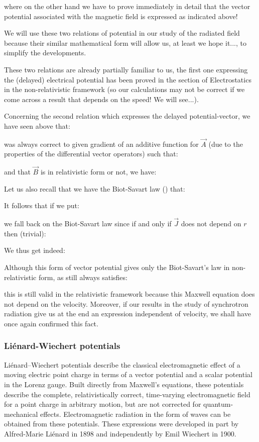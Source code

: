 	where on the other hand we have to prove immediately in detail that the vector potential associated with the magnetic field is expressed as indicated above!
	\begin{tcolorbox}[title=Remark,colframe=black,arc=10pt]
	We will use these two relations of potential in our study of the radiated field because their similar mathematical form will allow us, at least we hope it..., to simplify the developments.
	\end{tcolorbox}
	These two relations are already partially familiar to us, the first one expressing the (delayed) electrical potential has been proved in the section of Electrostatics in the non-relativistic framework (so our calculations may not be correct if we come across a result that depends on the speed! We will see...).

	Concerning the second relation which expresses the delayed potential-vector, we have seen above that:
	
	was always correct to given gradient of an additive function for $\vec{A}$ (due to the properties of the differential vector operators) such that:
	
	and that $\vec{B}$ is in relativistic form or not, we have:
	
	Let us also recall that we have the Biot-Savart law () that:
	
	It follows that if we put:
	
	we fall back on the Biot-Savart law since if and only if $\vec{J}$ does not depend on $r$ then (trivial):
	
	We thus get indeed:
	
	Although this form of vector potential gives only the Biot-Savart's law in non-relativistic form, as still always satisfies:
	
	this is still valid in the relativistic framework because this Maxwell equation does not depend on the velocity. Moreover, if our results in the study of synchrotron radiation give us at the end an expression independent of velocity, we shall have once again confirmed this fact.

	\subsubsection{Liénard-Wiechert potentials}\label{linear wiechard potentials}
	Liénard–Wiechert potentials describe the classical electromagnetic effect of a moving electric point charge in terms of a vector potential and a scalar potential in the Lorenz gauge. Built directly from Maxwell's equations, these potentials describe the complete, relativistically correct, time-varying electromagnetic field for a point charge in arbitrary motion, but are not corrected for quantum-mechanical effects. Electromagnetic radiation in the form of waves can be obtained from these potentials. These expressions were developed in part by Alfred-Marie Liénard in 1898 and independently by Emil Wiechert in 1900.
	
